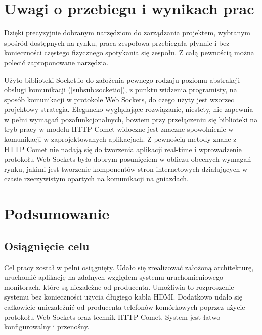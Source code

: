 \newpage
\section{Uwagi o przebiegu i wynikach prac}

Dzięki precyzyjnie dobranym narzędziom do zarządzania projektem, wybranym spośród dostępnych na rynku, praca zespołowa przebiegała płynnie i bez konieczności częstego fizycznego spotykania się zespołu. Z całą pewnością można polecić zaproponowane narzędzia. 

Użyto biblioteki Socket.io do założenia pewnego rodzaju poziomu abstrakcji obsługi komunikacji (\ref{subsub:socketio}), z punktu widzenia programisty, na sposób komunikacji w protokole Web Sockets, do czego użyty jest wzorzec projektowy strategia. Elegancko wyglądające rozwiązanie, niestety, nie zapewnia w pełni wymagań pozafunkcjonalnych, bowiem przy przełączeniu się biblioteki na tryb pracy w modelu HTTP Comet widoczne jest znaczne spowolnienie w komunikacji w zaprojektowanych aplikacjach. Z pewnością metody znane z HTTP Comet nie nadają się do tworzenia aplikacji real-time i wprowadzenie protokołu Web Sockets było dobrym posunięciem w obliczu obecnych wymagań rynku, jakimi jest tworzenie komponentów stron internetowych działających w czasie rzeczywistym opartych na komunikacji na gniazdach.


\section{Podsumowanie}

\subsection{Osiągnięcie celu}

Cel pracy został w pełni osiągnięty. Udało się zrealizować założoną architekturę, uruchomić aplikację na zdalnych względem systemu uruchomieniowego monitorach, które są niezależne od producenta. Umożliwia to rozproszenie systemu bez konieczności użycia długiego kabla HDMI. Dodatkowo udało się całkowicie uniezależnić od producenta telefonów komórkowych poprzez użycie protokołu Web Sockets oraz technik HTTP Comet. System jest łatwo konfigurowalny i przenośny.

